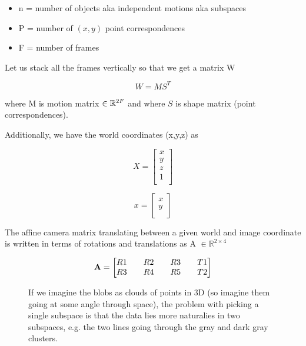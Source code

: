 

\newcommand{\matx}[1]{\mbox{\tt #1}} \newcommand{\vect}[1]{{\bf #1}}

\begin{itemize} \item n = number of objects aka independent motions aka subspaces \item P = number of $(x, y)$ point correspondences \item F = number
of frames \end{itemize}

Let us stack all the frames vertically so that we get a matrix W

$$W = MS^T$$

where M is motion matrix $\in \mathbb{R}^{2F \time 4}$ and where $S$ is shape matrix (point correspondences).

Additionally, we have the world coordinates (x,y,z) as

\begin{equation} X = \begin{bmatrix} x \\ y \\ z \\ 1 \\ \end{bmatrix} \end{equation}

\begin{equation} x = \begin{bmatrix} x \\ y \\ \end{bmatrix} \end{equation}

The affine camera matrix translating between a given world and image coordinate is written in terms of rotations and translations as A $\in
\mathbb{R}^{2 \times 4}$

\begin{equation} \vect A = \begin{bmatrix} R1 && R2 && R3 && T1 \\ R3 && R4 && R5 && T2 \\ \end{bmatrix} \end{equation}

 \begin{figure} \centering
     \caption{If we imagine the blobs as clouds of points in 3D (so imagine them going at some angle through space), the  problem with picking a
 single subspace is that the data lies more naturalies in two subspaces, e.g. the two lines going through the gray and dark gray clusters.}
 \end{figure}

